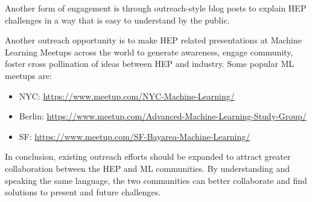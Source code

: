 Another form of engagement is through outreach-style blog posts to explain HEP challenges in a way that is easy to understand by the public.

Another outreach opportunity is to make HEP related presentations at Machine Learning Meetups across the world to generate awareness, engage community, foster cross pollination of ideas between HEP and industry. Some popular ML meetups are:
\begin{itemize}
 \item NYC: \url{https://www.meetup.com/NYC-Machine-Learning/}
 \item Berlin: \url{https://www.meetup.com/Advanced-Machine-Learning-Study-Group/}
 \item SF: \url{https://www.meetup.com/SF-Bayarea-Machine-Learning/}
\end{itemize}

In conclusion, existing outreach efforts should be expanded to attract greater collaboration between the HEP and ML communities. By understanding and speaking the same language, the two communities can better collaborate and find solutions to present and future challenges.



